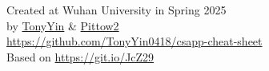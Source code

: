 \documentclass[twocolumn]{article}
\begin{document}


\vfill

\vfill
\begin{center}
    Created at Wuhan University in Spring 2025\\
    by \href{https://github.com/TonyYin0418}{TonyYin} \& \href{https://github.com/Pittow2}{Pittow2}\\
    \url{https://github.com/TonyYin0418/csapp-cheat-sheet}\\
    Based on \url{https://git.io/JcZ29}
\end{center}
\end{document}
